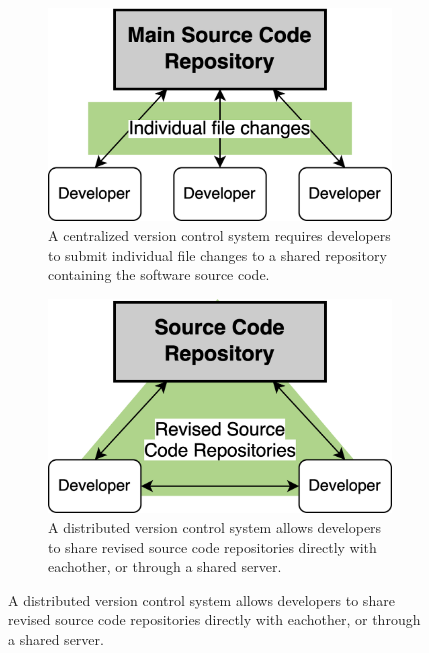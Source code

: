 \documentclass{article}
\begin{document}
\begin{figure}
    \begin{subfigure}[c][][c]{0.45\textwidth}
        \begin{center}
            \includegraphics[width=\textwidth]{centralized-vcs.png}
            \caption{
                \centering 
                A centralized version control system requires developers to submit individual file changes to a shared repository containing the software source code.
            }
            \label{fig:centralized-vcs}
        \end{center}
    \end{subfigure}
    \hspace{0.05\textwidth} 
    \begin{subfigure}[c][][c]{0.45\textwidth}
        \begin{center}
            \includegraphics[width=\textwidth]{distributed-vcs.png}
            \caption{
                \centering 
                A distributed version control system allows developers to share revised source code repositories directly with eachother, or through a shared server.
            }
            \label{fig:distributed-vcs}
        \end{center}
    \end{subfigure}
    \label{fig:version-control-systems}
\end{figure}
\end{document}
